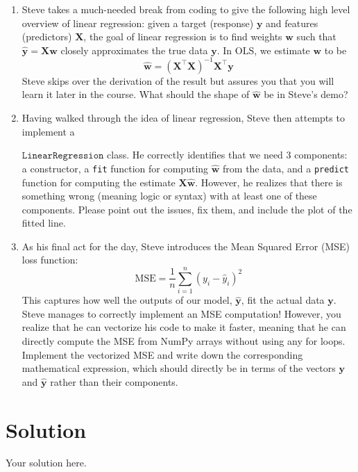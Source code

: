 \documentclass{../harvardml}
\theoremstyle{definition}
\theoremstyle{plain}
\newenvironment{solution}
  {\color{blue}\section*{Solution}}
{}
\begin{document}
\begin{problem} 
\begin{enumerate}
    Hint: check the documentation for \texttt{np.hstack}. 

    \item Steve takes a much-needed break from coding to give the following high level overview of linear regression: given a target (response) $\bm y$ and features (predictors) $\bm X$, the goal of linear regression is to find weights $\bm w$ such that $\bm{\hat y} = \bm X \bm w$ closely approximates the true data $\bm y$. In OLS, we estimate $\bm w$ to be
    \[\bm{\hat w} = (\bm X^\top \bm X)^{-1}\bm X^\top \bm y\]
    Steve skips over the derivation of the result but assures you that you will learn it later in the course. What should the shape of $\bm{\hat w}$ be in Steve's demo?

    \item Having walked through the idea of linear regression, Steve then attempts to implement a 
    
    $\texttt{LinearRegression}$ class. He correctly identifies that we need 3 components: a constructor, a \texttt{fit} function for computing $\hat{\bm w}$ from the data, and a \texttt{predict} function for computing the estimate $\bm X \hat{\bm w}$. However, he realizes that there is something wrong (meaning logic or syntax) with at least one of these components. Please point out the issues, fix them, and include the plot of the fitted line.

    \item As his final act for the day, Steve introduces the Mean Squared Error (MSE) loss function:
    \[\text{MSE} = \frac{1}{n}\sum_{i=1}^{n}(y_i - \hat y_i)^2\]
    This captures how well the outputs of our model, $\bm{\hat y}$, fit the actual data $\bm y$. Steve manages to correctly implement an MSE computation! However, you realize that he can vectorize his code to make it faster, meaning that he can directly compute the MSE from NumPy arrays without using any for loops. Implement the vectorized MSE and write down the corresponding mathematical expression, which should directly be in terms of the vectors $\bm y$ and $\hat{\bm y}$ rather than their components.
    
\end{enumerate}

\end{problem}

\begin{solution}
	Your solution here.
\end{solution}
\end{document}
